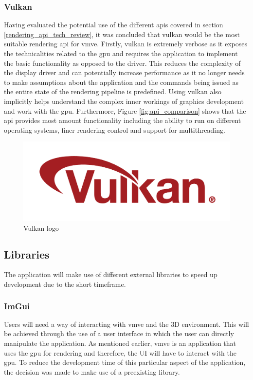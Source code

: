 \documentclass[11pt]{article}
\begin{document}
\subsubsection{Vulkan} \label{rendering_api}
Having evaluated the potential use of the different \glspl*{api} covered in
section \ref{rendering_api_tech_review}, it was concluded that \gls*{vulkan}
would be the most suitable rendering \gls*{api} for \gls*{vmve}. Firstly,
\gls*{vulkan} is extremely verbose as it exposes the technicalities related to
the \gls*{gpu} and requires the application to implement the basic functionality
as opposed to the driver. This reduces the complexity of the display driver and
can potentially increase performance as it no longer needs to make assumptions
about the application and the commands being issued as the entire state of the
rendering pipeline is predefined. Using \gls*{vulkan} also implicitly helps
understand the complex inner workings of graphics development and work with
the \gls*{gpu}. Furthermore, Figure \ref{fig:api_comparison} shows that the
\gls*{api} provides most amount functionality including the ability to run
on different operating systems, finer rendering control and support for
multithreading.

\begin{figure}[H]
  \centering
  \includegraphics[width=\textwidth]{images/vulkan_logo.png}
  \caption{Vulkan logo \cite{vulkan}}
  \label{fig:vulkan_logo}
\end{figure}


\subsection{Libraries}
The application will make use of different external libraries to speed up 
development due to the short timeframe.

\subsubsection{ImGui}
Users will need a way of interacting with \gls*{vmve} and the 3D environment.
This will be achieved through the use of a user interface in which the user can
directly manipulate the application. As mentioned earlier, \gls*{vmve} is an
application that uses the \gls*{gpu} for rendering and therefore, the UI will
have to interact with the \gls*{gpu}. To reduce the development time of this
particular aspect of the application, the decision was made to make use of a
preexisting library.
\end{document}
